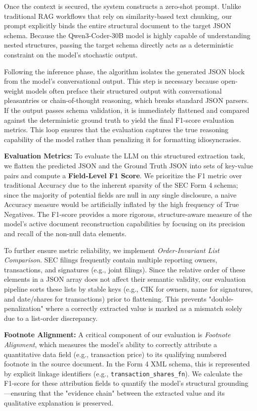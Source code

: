 \documentclass[journal, onecolumn]{IEEEtran}
\begin{document}
Once the context is secured, the system constructs a zero-shot prompt. Unlike traditional RAG workflows that rely on similarity-based text chunking, our prompt explicitly binds the entire structural document to the target JSON schema. Because the Qwen3-Coder-30B model is highly capable of understanding nested structures, passing the target schema directly acts as a deterministic constraint on the model's stochastic output. 

Following the inference phase, the algorithm isolates the generated JSON block from the model's conversational output. This step is necessary because open-weight models often preface their structured output with conversational pleasantries or chain-of-thought reasoning, which breaks standard JSON parsers. If the output passes schema validation, it is immediately flattened and compared against the deterministic ground truth to yield the final F1-score evaluation metrics. This loop ensures that the evaluation captures the true reasoning capability of the model rather than penalizing it for formatting idiosyncrasies.

\textbf{Evaluation Metrics:}
To evaluate the LLM on this structured extraction task, we flatten the predicted JSON and the Ground Truth JSON into sets of key-value pairs and compute a \textbf{Field-Level F1 Score}. We prioritize the F1 metric over traditional Accuracy due to the inherent sparsity of the SEC Form 4 schema; since the majority of potential fields are null in any single disclosure, a naive Accuracy measure would be artificially inflated by the high frequency of True Negatives. The F1-score provides a more rigorous, structure-aware measure of the model's active document reconstruction capabilities by focusing on its precision and recall of the non-null data elements.

To further ensure metric reliability, we implement \textit{Order-Invariant List Comparison}. SEC filings frequently contain multiple reporting owners, transactions, and signatures (e.g., joint filings). Since the relative order of these elements in a JSON array does not affect their semantic validity, our evaluation pipeline sorts these lists by stable keys (e.g., CIK for owners, name for signatures, and date/shares for transactions) prior to flattening. This prevents "double-penalization" where a correctly extracted value is marked as a mismatch solely due to a list-order discrepancy.

\textbf{Footnote Alignment:}
A critical component of our evaluation is \textit{Footnote Alignment}, which measures the model's ability to correctly attribute a quantitative data field (e.g., transaction price) to its qualifying numbered footnote in the source document. In the Form 4 XML schema, this is represented by explicit linkage identifiers (e.g., \texttt{transaction\_shares\_fn}). We calculate the F1-score for these attribution fields to quantify the model's structural grounding---ensuring that the "evidence chain" between the extracted value and its qualitative explanation is preserved.
\end{document}
